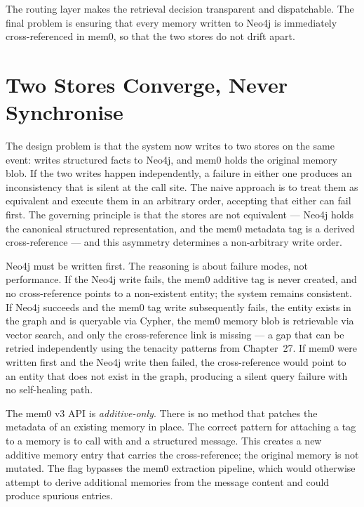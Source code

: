 The routing layer makes the retrieval decision transparent and
dispatchable. The final problem is ensuring that every memory written to
Neo4j is immediately cross-referenced in mem0, so that the two stores do
not drift apart.


\section{Two Stores Converge, Never Synchronise}
\label{sec:kg-consistency}

The design problem is that the system now writes to two stores on the same
event:  writes structured facts to Neo4j,
and mem0 holds the original memory blob. If the two writes happen
independently, a failure in either one produces an inconsistency that is
silent at the call site. The naive approach is to treat them as equivalent
and execute them in an arbitrary order, accepting that either can fail
first. The governing principle is that the stores are not equivalent ---
Neo4j holds the canonical structured representation, and the mem0 metadata
tag is a derived cross-reference --- and this asymmetry determines a
non-arbitrary write order.

Neo4j must be written first. The reasoning is about failure modes, not
performance. If the Neo4j write fails, the mem0 additive tag is never
created, and no cross-reference points to a non-existent entity; the
system remains consistent. If Neo4j succeeds and the mem0 tag write
subsequently fails, the entity exists in the graph and is queryable via
Cypher, the mem0 memory blob is retrievable via vector search, and only
the cross-reference link is missing --- a gap that can be retried
independently using the tenacity patterns from Chapter~27. If mem0 were
written first and the Neo4j write then failed, the cross-reference would
point to an entity that does not exist in the graph, producing a silent
query failure with no self-healing path.

\begin{notebox}
The mem0 v3 API is \emph{additive-only}. There is no
 method that patches the metadata
of an existing memory in place. The correct pattern for attaching a
 tag to a memory is to call 
with  and a structured message. This creates a new
additive memory entry that carries the cross-reference; the original
memory is not mutated. The  flag bypasses the mem0
extraction pipeline, which would otherwise attempt to derive additional
memories from the message content and could produce spurious entries.
\end{notebox}

